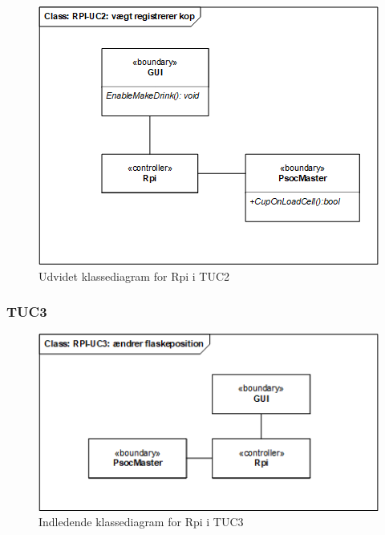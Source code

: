 \begin{figure}[H]
    \centering
    \includegraphics[width=1\textwidth]{Images/Applikationsmodeller/rpi/rpi_UdvidetklassediagramTestUC2.png}
    \caption{Udvidet klassediagram for Rpi i TUC2}
    \label{fig:UcdTUC2Rpi}
\end{figure}

\subsubsection{TUC3}

\begin{figure}[H]
    \centering
    \includegraphics[width=1\textwidth]{Images/Applikationsmodeller/rpi/rpi_klassediagramTestUC3.png}
    \caption{Indledende klassediagram for Rpi i TUC3}
    \label{fig:cdTUC3Rpi}
\end{figure}

